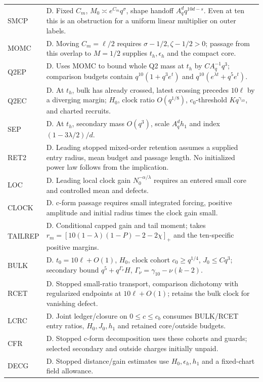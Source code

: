 \documentclass[11pt]{article}
\begin{document}
\begin{longtable}{@{}p{}p{}@{}}
SMCP & D. Fixed \(C_m\), \(M_0\asymp e^{C_m}q^\sigma\), shape handoff \(A_q^dq^{10d-s}\). Even at ten this is an obstruction for a uniform linear multiplier on outer labels.\\
MOMC & D. Moving \(C_m=\ell/2\) requires \(\sigma-1/2,\zeta-1/2>0\); passage from this overlap to \(M=1/2\) supplies \(t_h,\epsilon_h\) and the compact core.\\
Q2EP & D. Uses MOMC to bound whole Q2 mass at \(t_h\) by \(C A_q^{-1}q^3\); comparison budgets contain \(q^{10}(1+q^3 e^t)\) and \(q^{10}(e^{\lambda t}+q^5 e^t)\).\\
Q2EC & D. At \(t_h\), bulk has already crossed, latest crossing precedes \(10\ell\) by a diverging margin; \(H_0\), clock ratio \(O(q^{1/8})\), \(c_0\)-threshold \(Kq^{\gamma_{10}}\), and charted recruits.\\
SEP & D. At \(t_h\), secondary mass \(O(q^3)\), scale \(A_q^dh_1\) and index \((1-3\lambda/2)/d\).\\
RET2 & D. Leading stopped mixed-order retention assumes a supplied entry radius, mean budget and passage length. No initialized power law follows from the implication.\\
LOC & D. Leading local clock gain \(N_0^{-\alpha/\lambda}\) requires an entered small core and controlled mean and defects.\\
CLOCK & D. c-form passage requires small integrated forcing, positive amplitude and initial radius times the clock gain small.\\
TAILREP & D. Conditional capped gain and tail moment; takes \(r_m=[10(1-\lambda)(1-P)-2-2\chi]_+\) and the ten-specific positive margins.\\
BULK & D. \(t_0=10\ell+O(1)\), \(H_0\), clock cohort \(c_0\ge q^{1/4}\), \(J_0\le Cq^3\); secondary bound \(q^5+q^{\Gamma_\nu}H\), \(\Gamma_\nu=\gamma_{10}-\nu(k-2)\).\\
RCET & D. Stopped small-ratio transport, comparison dichotomy with regularized endpoints at \(10\ell+O(1)\); retains the bulk clock for vanishing defect.\\
LCRC & D. Joint ledger/closure on \(0\le c\le c_b\) consumes BULK/RCET entry ratios, \(H_0,J_0,h_1\) and retained core/outside budgets.\\
CFR & D. Stopped c-form decomposition uses these cohorts and guards; selected secondary and outside charges initially unpaid.\\
DECG & D. Stopped distance/gain estimates use \(H_0,\epsilon_h,h_1\) and a fixed-chart field allowance.\\

\end{longtable}
\end{document}
